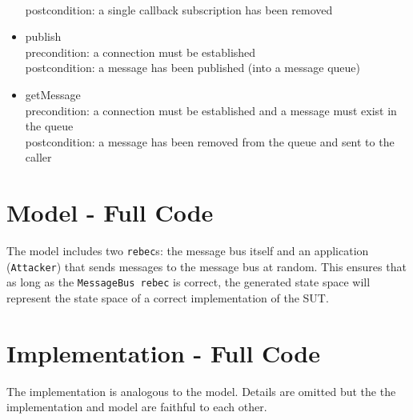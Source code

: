 \documentclass{article}
\begin{document}
\begin{appendices}
\begin{itemize}
	\\	postcondition: a single callback subscription has been removed
	\item publish
	\\	precondition:  a connection must be established
	\\	postcondition: a message has been published (into a message queue)
	\item getMessage
	\\	precondition:  a connection must be established and a message must exist in the queue
	\\	postcondition: a message has been removed from the queue and sent to the caller
\end{itemize}

\section{\Rebeca Model - Full Code}



The \Rebeca model includes two \texttt{rebec}s: the message bus itself and an application (\texttt{Attacker}) that sends messages to the message bus at random. This ensures that as long as the \texttt{MessageBus rebec} is correct, the generated state space will represent the state space of a correct implementation of the SUT.

\newpage
\section{Implementation - Full Code}



The implementation is analogous to the \Rebeca model. Details are omitted but the the implementation and model are faithful to each other. 

%
%
%
%
%

\end{appendices}
\end{document}
